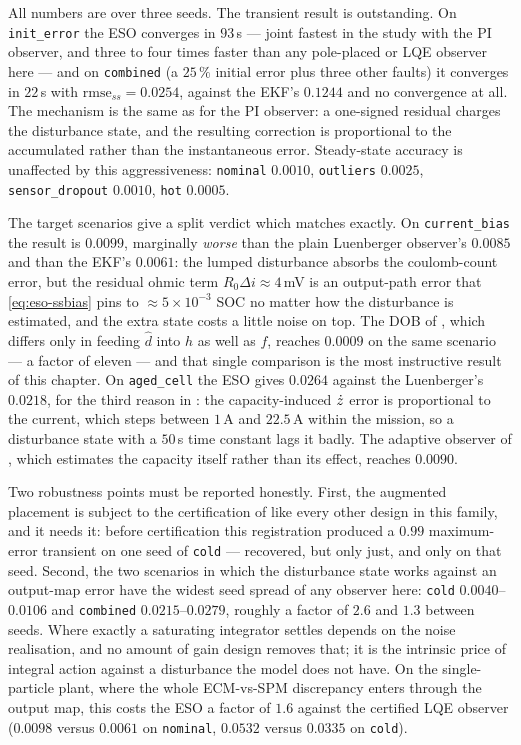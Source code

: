 All numbers are over three seeds.  The transient result is outstanding.  On
\texttt{init\_error} the ESO converges in $93$\,s --- joint fastest in the study with the PI
observer, and three to four times faster than any pole-placed or LQE observer here --- and on
\texttt{combined} (a $25\,\%$ initial error plus three other faults) it converges in $22$\,s with
$\mathrm{rmse}_{ss}=0.0254$, against the EKF's $0.1244$ and no convergence at all.  The mechanism
is the same as for the PI observer: a one-signed residual charges the disturbance state, and the
resulting correction is proportional to the accumulated rather than the instantaneous error.
Steady-state accuracy is unaffected by this aggressiveness: \texttt{nominal} $0.0010$,
\texttt{outliers} $0.0025$, \texttt{sensor\_dropout} $0.0010$, \texttt{hot} $0.0005$.

The target scenarios give a split verdict which matches  exactly.  On
\texttt{current\_bias} the result is $0.0099$, marginally \emph{worse} than the plain Luenberger
observer's $0.0085$ and than the EKF's $0.0061$: the lumped disturbance absorbs the coulomb-count
error, but the residual ohmic term $R_0\Delta i \approx 4$\,mV is an output-path error that
\eqref{eq:eso-ssbias} pins to $\approx5\times10^{-3}$ SOC no matter how the disturbance is
estimated, and the extra state costs a little noise on top.  The DOB of , which
differs only in feeding $\hat{d}$ into $h$ as well as $f$, reaches $0.0009$ on the same scenario ---
a factor of eleven --- and that single comparison is the most instructive result of this chapter.
On \texttt{aged\_cell} the ESO gives $0.0264$ against the Luenberger's $0.0218$, for the third
reason in : the capacity-induced $\dot{z}$ error is proportional to the
current, which steps between $1$\,A and $22.5$\,A within the mission, so a disturbance state with
a $50$\,s time constant lags it badly.  The adaptive observer of ,
which estimates the capacity itself rather than its effect, reaches $0.0090$.

Two robustness points must be reported honestly.  First, the augmented placement is subject to
the certification of  like every other design in this family, and it needs
it: before certification this registration produced a $0.99$ maximum-error transient on one seed
of \texttt{cold} --- recovered, but only just, and only on that seed.  Second, the two scenarios
in which the disturbance state works against an output-map error have the widest seed spread of
any observer here: \texttt{cold} $0.0040$--$0.0106$ and \texttt{combined} $0.0215$--$0.0279$,
roughly a factor of $2.6$ and $1.3$ between seeds.  Where exactly a saturating integrator settles
depends on the noise realisation, and no amount of gain design removes that; it is the intrinsic
price of integral action against a disturbance the model does not have.  On the single-particle
plant, where the whole ECM-vs-SPM discrepancy enters through the output map, this costs the ESO a
factor of $1.6$ against the certified LQE observer ($0.0098$ versus $0.0061$ on \texttt{nominal},
$0.0532$ versus $0.0335$ on \texttt{cold}).

